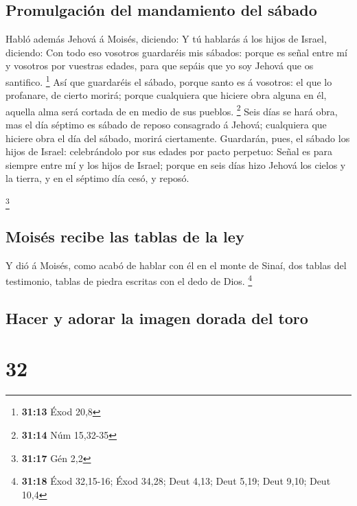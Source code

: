 \hypertarget{promulgaciuxf3n-del-mandamiento-del-suxe1bado}{%
\subsection{Promulgación del mandamiento del
sábado}\label{promulgaciuxf3n-del-mandamiento-del-suxe1bado}}

 Habló además Jehová á Moisés, diciendo: 
Y tú hablarás á los hijos de Israel, diciendo: Con todo eso vosotros
guardaréis mis sábados: porque es señal entre mí y vosotros por vuestras
edades, para que sepáis que yo soy Jehová que os santifico. \footnote{\textbf{31:13}
  Éxod 20,8}  Así que guardaréis el sábado, porque santo
es á vosotros: el que lo profanare, de cierto morirá; porque cualquiera
que hiciere obra alguna en él, aquella alma será cortada de en medio de
sus pueblos. \footnote{\textbf{31:14} Núm 15,32-35}  Seis
días se hará obra, mas el día séptimo es sábado de reposo consagrado á
Jehová; cualquiera que hiciere obra el día del sábado, morirá
ciertamente.  Guardarán, pues, el sábado los hijos de
Israel: celebrándolo por sus edades por pacto perpetuo: 
Señal es para siempre entre mí y los hijos de Israel; porque en seis
días hizo Jehová los cielos y la tierra, y en el séptimo día cesó, y
reposó.

\footnote{\textbf{31:17} Gén 2,2}

\hypertarget{moisuxe9s-recibe-las-tablas-de-la-ley}{%
\subsection{Moisés recibe las tablas de la
ley}\label{moisuxe9s-recibe-las-tablas-de-la-ley}}

 Y dió á Moisés, como acabó de hablar con él en el monte
de Sinaí, dos tablas del testimonio, tablas de piedra escritas con el
dedo de Dios. \footnote{\textbf{31:18} Éxod 32,15-16; Éxod 34,28; Deut
  4,13; Deut 5,19; Deut 9,10; Deut 10,4}

\hypertarget{hacer-y-adorar-la-imagen-dorada-del-toro}{%
\subsection{Hacer y adorar la imagen dorada del
toro}\label{hacer-y-adorar-la-imagen-dorada-del-toro}}

\hypertarget{section-31}{%
\section{32}\label{section-31}}

